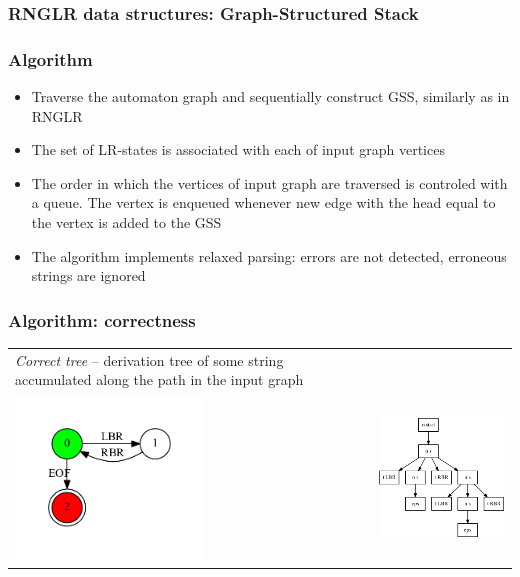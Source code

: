 \documentclass{beamer}
\begin{document}
\begin{frame}
  \transwipe[direction=90]
  \frametitle{RNGLR data structures: Graph-Structured Stack}
  
\end{frame}

\begin{frame}
  \transwipe[direction=90]
  \frametitle{Algorithm}
  \begin{itemize}
    \item Traverse the automaton graph and sequentially construct GSS, similarly as in RNGLR
    \item The set of LR-states is associated with each of input graph vertices
    \item The order in which the vertices of input graph are traversed is 
controled with a queue. The vertex is enqueued whenever new edge with the head 
equal to the vertex is added to the GSS
  \end{itemize}
  \begin{itemize}
    \item The algorithm implements relaxed parsing: errors are not detected, 
erroneous strings are ignored
  \end{itemize}

\end{frame}

\begin{frame}
\transwipe[direction=90]
\frametitle{Algorithm: correctness}
\begin{tabular}{p{5.3cm} p{6.7cm}}
\emph{Correct tree} -- derivation tree of some string accumulated along the 
path in the input graph
&
\\
\includegraphics[width=5cm]{pictures/in3.pdf}
&
\includegraphics[width=6cm]{pictures/sppf2.eps}
\end{tabular}
\end{frame}
\end{document}
